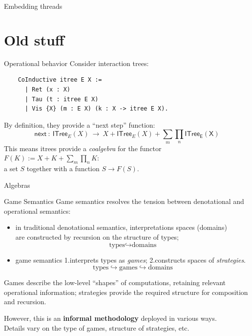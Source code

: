 \documentclass[aspectratio=1610,mathserif]{beamer}
\begin{document}
\begin{frame}{Embedding threads}
  
\end{frame}


\appendix

\section{Old stuff}
\frame\sectionpage

\begin{frame}[fragile]{Operational behavior} %
  Consider interaction trees:
\begin{verbatim}
    CoInductive itree E X :=
      | Ret (x : X)
      | Tau (t : itree E X)
      | Vis {X} (m : E X) (k : X -> itree E X).
\end{verbatim}

  By definition, they provide a ``next step'' function:
  \[
    \mathsf{next} \: : \:
      \mathsf{ITree}_E(X) \: \rightarrow \:
        X + \mathsf{ITree}_E(X) + \sum_m \prod_n \mathsf{ITree_E(X)}
  \]
  This means itrees provide a \emph{coalgebra} for the functor
  $F(K) := X + K + \sum_m \prod_n K$: \\
  a set $S$ together with a function $S \rightarrow F(S)$.
\end{frame}

\begin{frame}{Algebras}
\end{frame}

\begin{frame}{Game Semantics}
  Game semantics resolves the tension between
  denotational and operational semantics:
  \begin{itemize}
    \item in traditional denotational semantics,
      interpretations spaces (domains) \\
      are constructed by recursion on the structure of types;
      \[ \text{types} \hookrightarrow \text{domains} \]
    \item game semantics
      1.\@ interprets types as \emph{games};
      2.\@ constructs spaces of \emph{strategies}.
      \[ \text{types} \hookrightarrow \text{games} \hookrightarrow \text{domains} \]
  \end{itemize}
  \pause
  Games describe the low-level ``shapes'' of computations,
  retaining relevant operational information;
  strategies provide the required structure
  for composition and recursion.

  \pause
  \vspace{1em}
  However, this is an \textbf{informal methodology} deployed in various ways. \\
  Details vary on the type of games, structure of strategies, etc.
\end{frame}
\end{document}
